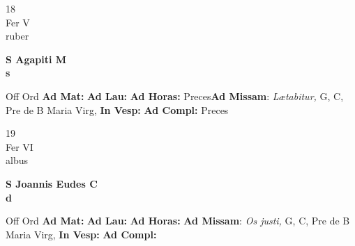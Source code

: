 \documentclass[10pt, openany]{book}
\begin{document}
        \begin{center}
            \begin{minipage}{3.5in}
                \vspace{2em}
                \begin{minipage}{0.5in}
                    {\Huge 18} \\
                    {\normalsize Fer V} \\
                    {\normalsize ruber}
                \end{minipage}
                \begin{minipage}{3.0in}
                    \textbf{ \large S Agapiti M \\
                    \textnormal{\normalsize s}} \\ 
                \end{minipage}
                \begin{justify}Off Ord
                    \textbf{Ad Mat: }
                    \textbf{Ad Lau: }
                    \textbf{Ad Horas: }Preces\textbf{Ad Missam}: \textit{Lætabitur,} G, C, Pre de B Maria Virg,  
                    \textbf{In Vesp: }
                    \textbf{Ad Compl: }Preces
                \end{justify}
            \end{minipage}
        \end{center}
    
        \begin{center}
            \begin{minipage}{3.5in}
                \vspace{2em}
                \begin{minipage}{0.5in}
                    {\Huge 19} \\
                    {\normalsize Fer VI} \\
                    {\normalsize albus}
                \end{minipage}
                \begin{minipage}{3.0in}
                    \textbf{ \large S Joannis Eudes C \\
                    \textnormal{\normalsize d}} \\ 
                \end{minipage}
                \begin{justify}Off Ord
                    \textbf{Ad Mat: }
                    \textbf{Ad Lau: }
                    \textbf{Ad Horas: }\textbf{Ad Missam}: \textit{Os justi,} G, C, Pre de B Maria Virg,  
                    \textbf{In Vesp: }
                    \textbf{Ad Compl: }
                \end{justify}
            \end{minipage}
        \end{center}
    
\end{document}
